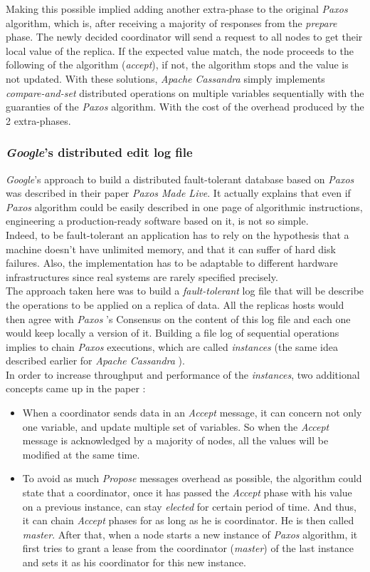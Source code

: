 \documentclass[a4paper]{report}
\newcommand{\ca}{\emph{Apache Cassandra }}
\newcommand{\px}{\emph{Paxos }}
\begin{document}
Making this possible implied adding another extra-phase to the original \px algorithm, which is, after receiving a majority of responses from the \emph{prepare} phase. The newly decided coordinator will send a request to all nodes to get their local value of the replica. If the expected value match, the node proceeds to the following of the algorithm (\emph{accept}), if not, the algorithm stops and the value is not updated.
With these solutions, \ca simply implements \emph{compare-and-set} distributed operations on multiple variables sequentially with the guaranties of the \px algorithm. With the cost of the overhead produced by the 2 extra-phases.

\subsubsection{\emph{Google}'s distributed edit log file}
\emph{Google}'s approach to build a distributed fault-tolerant database based on \px was described in their paper \emph{Paxos Made Live}. It actually explains that even if \px algorithm could be easily described in one page of algorithmic instructions, engineering a production-ready software based on it, is not so simple.\\
Indeed, to be fault-tolerant an application has to rely on the hypothesis that a machine doesn't have unlimited memory, and that it can suffer of hard disk failures. Also, the implementation has to be adaptable to different hardware infrastructures since real systems are rarely specified precisely.\\
The approach taken here was to build a \emph{fault-tolerant} log file that will be describe the operations to be applied on a replica of data. All the replicas hosts would then agree with \px's Consensus on the content of this log file and each one would keep locally a version of it. Building a file log of sequential operations implies to chain \px executions, which are called \emph{instances} (the same idea described earlier for \ca).\\
In order to increase throughput and performance of the \emph{instances}, two additional concepts came up in the paper : 
\begin{itemize}
	\item When a coordinator sends data in an \emph{Accept} message, it can concern not only one variable, and update multiple set of variables. So when the \emph{Accept} message is acknowledged by a majority of nodes, all the values will be modified at the same time.
	\item To avoid as much \emph{Propose} messages overhead as possible, the algorithm could state that a coordinator, once it has passed the \emph{Accept} phase with his value on a previous instance, can stay \emph{elected} for certain period of time. And thus, it can chain \emph{Accept} phases for as long as he is coordinator. He is then called \emph{master}. After that, when a node starts a new instance of \px algorithm, it first tries to grant a lease from the coordinator (\emph{master}) of the last instance and sets it as his coordinator for this new instance.
\end{itemize}
\end{document}
